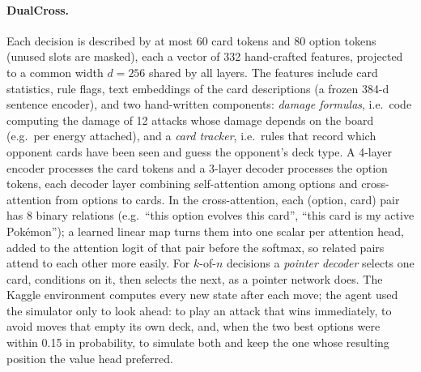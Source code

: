 \documentclass{article}
\begin{document}
\paragraph*{DualCross.} Each decision is described by at most 60 card tokens and 80 option tokens (unused slots are masked), each a vector of 332 hand-crafted features, projected to a common width $d{=}256$ shared by all layers. The features include card statistics, rule flags, text embeddings of the card descriptions (a frozen 384-d sentence encoder), and two hand-written components: \emph{damage formulas}, i.e.\ code computing the damage of 12 attacks whose damage depends on the board (e.g.\ per energy attached), and a \emph{card tracker}, i.e.\ rules that record which opponent cards have been seen and guess the opponent's deck type. A 4-layer encoder processes the card tokens and a 3-layer decoder processes the option tokens, each decoder layer combining self-attention among options and cross-attention from options to cards. In the cross-attention, each (option, card) pair has 8 binary relations (e.g.\ ``this option evolves this card'', ``this card is my active Pok\'emon''); a learned linear map turns them into one scalar per attention head, added to the attention logit of that pair before the softmax, so related pairs attend to each other more easily. For $k$-of-$n$ decisions a \emph{pointer decoder} selects one card, conditions on it, then selects the next, as a pointer network does. The Kaggle environment computes every new state after each move; the agent used the simulator only to look ahead: to play an attack that wins immediately, to avoid moves that empty its own deck, and, when the two best options were within 0.15 in probability, to simulate both and keep the one whose resulting position the value head preferred.
\end{document}
